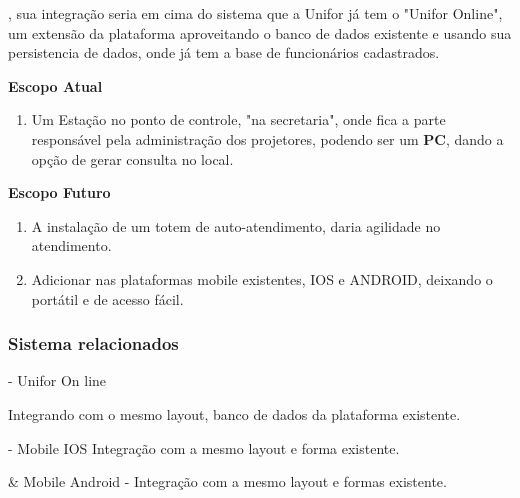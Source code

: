\begin{flushleft}
 
\mysiglaproject, sua integração seria em cima do sistema que a Unifor já tem o
"Unifor Online", um extensão da plataforma aproveitando o banco de dados
existente e usando sua persistencia de dados, onde já tem a base de funcionários
cadastrados.


  \textbf{Escopo Atual}
  
  \begin{enumerate}

    \item Um Estação no ponto de controle, "na secretaria", onde fica a parte responsável
pela administração dos projetores, podendo ser um \textbf{PC}, dando a opção de
gerar consulta no local. 
  
  \end{enumerate}


  \textbf{Escopo Futuro}
  
  \begin{enumerate}
  
    \item A instalação de um totem de auto-atendimento, daria agilidade no atendimento. 

    \item Adicionar nas plataformas mobile existentes, IOS e ANDROID, deixando o portátil e de acesso fácil. 
  
  \end{enumerate}

\end{flushleft}


\subsubsection{Sistema relacionados}

  \begin{center} 


    \mysiglaproject - Unifor On line

    Integrando com o mesmo layout, banco de dados da plataforma existente.

    \hspace{2.0cm}
    \hline{}
    \hspace{2.0cm}


    \mysiglaproject - Mobile IOS
    Integração com a mesmo layout e forma existente. 


    \hspace{2.0cm}
    \hline{}
    \hspace{2.0cm}



    \mysiglaproject & Mobile Android - Integração com a mesmo layout e formas existente.

    \hspace{2.0cm}
    \hline{}
    \hspace{2.0cm}
  
  \end{center}

